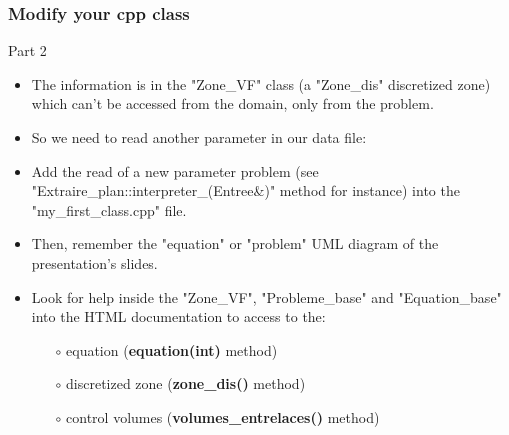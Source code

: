 \documentclass[10pt, hyperref={unicode=true,pdfusetitle, bookmarks=true,bookmarksnumbered=false,bookmarksopen=false, breaklinks=false,pdfborder={0 0 1},backref=true,colorlinks=true,linkcolor=darkblue,pageanchor, urlcolor=darkblue}]{beamer}
\begin{document}
\begin{frame}
\frametitle{Modify your cpp class}
\begin{block}{Part 2}
\begin{itemize}
\item The information is in the "Zone\_VF" class (a "Zone\_dis" discretized zone) which can't be accessed 
from the domain, only from the problem. 

\item So we need to read another parameter in our data file:\\
\begin{center}
\end{center}

\item Add the read of a new parameter problem (see "Extraire\_plan::interpreter\_(Entree\&)" method for instance) into the "my\_first\_class.cpp" file.

\item Then, remember the "equation" or "problem" UML diagram of the presentation's slides.

\item Look for help inside the "Zone\_VF", "Probleme\_base" and "Equation\_base" into the HTML documentation to access to the:
    \begin{itemize}
    \item [$\circ$] equation (\textbf{equation(int)} method)
    \item [$\circ$] discretized zone (\textbf{zone\_dis()} method)
    \item [$\circ$] control volumes (\textbf{volumes\_entrelaces()} method)
    \end{itemize}
\end{itemize}

\end{block}
\end{frame}
\end{document}
